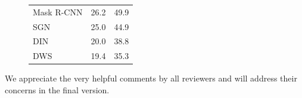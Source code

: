 \documentclass{article}
\begin{document}
\begin{figure}[t]
\begin{minipage}[b]{0.30\textwidth}
\begin{tabular}{l|cc}
           Mask R-CNN & 26.2 & 49.9 \\
           SGN \cite{liu2017sgn} & 25.0 & 44.9 \\
           DIN \cite{arnab2017pixelwise} & 20.0 & 38.8 \\
           DWS \cite{bai2017deep} & 19.4 & 35.3 \\
        \end{tabular}
    \label{tab:cityscapes_test}
\end{minipage}
\end{figure}

We appreciate the very helpful comments by all reviewers and will address their concerns in the final version.
\end{document}

